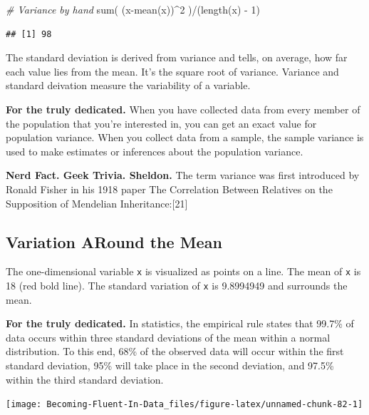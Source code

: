 \documentclass[
]{book}
\newenvironment{Shaded}{\begin{snugshade}}{\end{snugshade}}
\newcommand{\CommentTok}[1]{\textcolor[rgb]{0.56,0.35,0.01}{\textit{#1}}}
\newcommand{\DecValTok}[1]{\textcolor[rgb]{0.00,0.00,0.81}{#1}}
\newcommand{\FunctionTok}[1]{\textcolor[rgb]{0.00,0.00,0.00}{#1}}
\newcommand{\NormalTok}[1]{#1}
\newcommand{\SpecialCharTok}[1]{\textcolor[rgb]{0.00,0.00,0.00}{#1}}
\begin{document}
\begin{Shaded}
\begin{Highlighting}[]
\CommentTok{\# Variance by hand}
\FunctionTok{sum}\NormalTok{( (x}\SpecialCharTok{{-}}\FunctionTok{mean}\NormalTok{(x))}\SpecialCharTok{\^{}}\DecValTok{2}\NormalTok{ )}\SpecialCharTok{/}\NormalTok{(}\FunctionTok{length}\NormalTok{(x) }\SpecialCharTok{{-}} \DecValTok{1}\NormalTok{) }
\end{Highlighting}
\end{Shaded}

\begin{verbatim}
## [1] 98
\end{verbatim}

The standard deviation is derived from variance and tells, on average, how far each value lies from the mean. It's the square root of variance. Variance and standard deivation measure the variability of a variable.

\textbf{For the truly dedicated.} When you have collected data from every member of the population that you're interested in, you can get an exact value for population variance. When you collect data from a sample, the sample variance is used to make estimates or inferences about the population variance.

\textbf{Nerd Fact. Geek Trivia. Sheldon.} The term variance was first introduced by Ronald Fisher in his 1918 paper The Correlation Between Relatives on the Supposition of Mendelian Inheritance:{[}21{]}

\hypertarget{variation-around-the-mean}{%
\subsection{Variation ARound the Mean}\label{variation-around-the-mean}}

The one-dimensional variable \texttt{x} is visualized as points on a line. The mean of \texttt{x} is 18 (red bold line). The standard variation of \texttt{x} is 9.8994949 and surrounds the mean.

\textbf{For the truly dedicated.} In statistics, the empirical rule states that 99.7\% of data occurs within three standard deviations of the mean within a normal distribution. To this end, 68\% of the observed data will occur within the first standard deviation, 95\% will take place in the second deviation, and 97.5\% within the third standard deviation.

\begin{center}\texttt{[image: Becoming-Fluent-In-Data\_files/figure-latex/unnamed-chunk-82-1]} \end{center}
\end{document}
